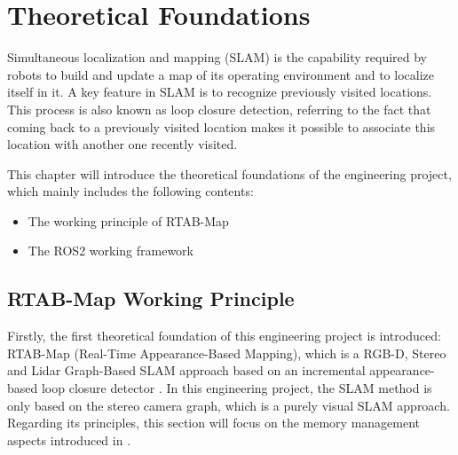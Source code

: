 \chapter{Theoretical Foundations\label{theoretical_foundations}}
Simultaneous localization and mapping (SLAM) \citep{dissanayake2001solution} is the capability required by robots to build and update a map of its operating environment and to localize itself in it. A key feature in SLAM is to recognize previously visited locations. This process is also known as loop closure detection, referring to the fact that coming back to a previously visited location makes it possible to associate this location with another one recently visited.

This chapter will introduce the theoretical foundations of the engineering project, which mainly includes the following contents:
\begin{itemize}
    \item The working principle of RTAB-Map
    \item The ROS2 working framework
\end{itemize}

\section{RTAB-Map Working Principle\label{sec:rtabmap_working_principle}}

Firstly, the first theoretical foundation of this engineering project is introduced: RTAB-Map (Real-Time Appearance-Based Mapping), which is a RGB-D, Stereo and Lidar Graph-Based SLAM approach based on an incremental appearance-based loop closure detector \citep{rtabmap}. In this engineering project, the SLAM method is only based on the stereo camera graph, which is a purely visual SLAM approach. Regarding its principles, this section will focus on the memory management aspects introduced in \citep{labbe2024memory}.

